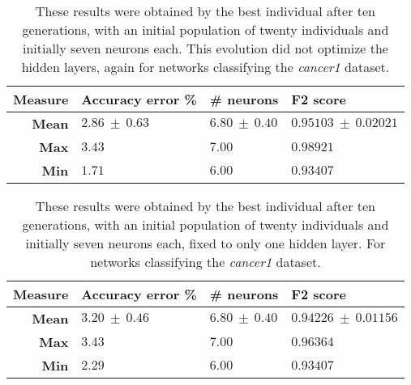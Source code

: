 \documentclass[runningheads]{llncs}
\begin{document}
 \begin{table}
     \centering
     \caption{
These results were obtained by the best individual after ten generations, with
an initial population of twenty individuals and initially seven
neurons each. %
This evolution did not optimize the hidden layers, again for networks
classifying the \emph{cancer1} dataset.}
     \label{tab:fixed-7-1-const-can1}
     \begin{tabular}{rlll}
        \textbf{Measure}   & \textbf{Accuracy error \%} & \textbf{\# neurons} & \textbf{F2 score} \\
         \hline
         \textbf{Mean}      & $2.86\ \pm\ 0.63$      & $6.80\ \pm\ 0.40$       & $0.95103\ \pm\ 0.02021$ \\
         \textbf{Max}       & $3.43$                 & $7.00$                  & $0.98921$               \\
         \textbf{Min}       & $1.71$                 & $6.00$                  & $0.93407$               \\
     \end{tabular}
 \end{table}

 \begin{table}
     \centering
     \caption{
These results were obtained by the best individual after ten generations, with
an initial population of twenty individuals and initially seven neurons each, fixed to 
only one hidden layer. For networks classifying the \emph{cancer1} dataset.}
     \label{tab:fixed-7-1-inicial-can1}
     \begin{tabular}{rlll}
         \textbf{Measure}   & \textbf{Accuracy error \%} & \textbf{\# neurons} & \textbf{F2 score} \\
         \hline
         \textbf{Mean}      & $3.20\ \pm\ 0.46$      & $6.80\ \pm\ 0.40$       & $0.94226\ \pm\ 0.01156$ \\
         \textbf{Max}       & $3.43$                 & $7.00$                  & $0.96364$               \\
         \textbf{Min}       & $2.29$                 & $6.00$                  & $0.93407$               \\
     \end{tabular}
 \end{table}
\end{document}
